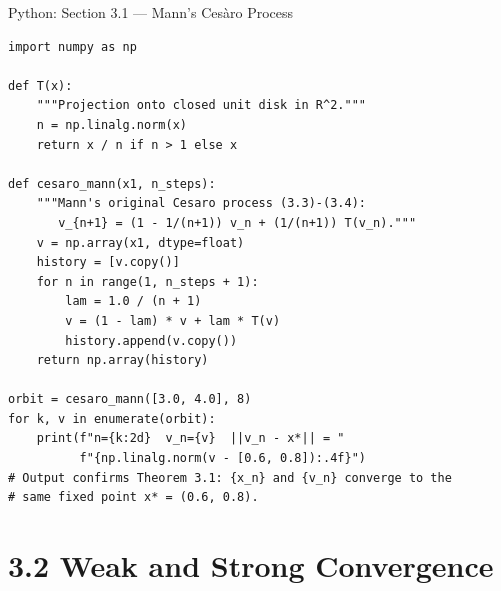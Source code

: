 \documentclass[aspectratio=169,10pt]{beamer}
\begin{document}
\begin{frame}[fragile]{Python: Section 3.1 --- Mann's Ces\`aro Process}
  \begin{lstlisting}[style=python]
import numpy as np

def T(x):
    """Projection onto closed unit disk in R^2."""
    n = np.linalg.norm(x)
    return x / n if n > 1 else x

def cesaro_mann(x1, n_steps):
    """Mann's original Cesaro process (3.3)-(3.4):
       v_{n+1} = (1 - 1/(n+1)) v_n + (1/(n+1)) T(v_n)."""
    v = np.array(x1, dtype=float)
    history = [v.copy()]
    for n in range(1, n_steps + 1):
        lam = 1.0 / (n + 1)
        v = (1 - lam) * v + lam * T(v)
        history.append(v.copy())
    return np.array(history)

orbit = cesaro_mann([3.0, 4.0], 8)
for k, v in enumerate(orbit):
    print(f"n={k:2d}  v_n={v}  ||v_n - x*|| = "
          f"{np.linalg.norm(v - [0.6, 0.8]):.4f}")
# Output confirms Theorem 3.1: {x_n} and {v_n} converge to the
# same fixed point x* = (0.6, 0.8).
  \end{lstlisting}
\end{frame}

\section{3.2 Weak and Strong Convergence}
\end{document}
